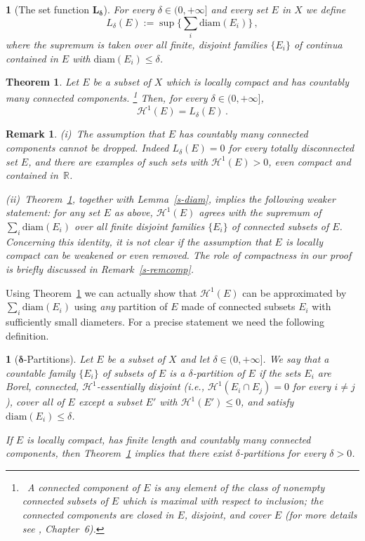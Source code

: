 \documentclass[11pt,reqno,a4paper,final]{amsart}
\numberwithin{equation}{section}
\theoremstyle{mytheorem}
\newtheorem{theorem}[subsection]{Theorem}
\theoremstyle{myremark}
\newtheorem{remark}[subsection]{Remark}
\theoremstyle{myparagraph}
\newtheorem{parag}[subsection]{}
\newcommand{\footnoteb}[1]{\footnote{~#1}}
\newcommand{\R}{\mathbb{R}}
\newcommand{\Haus}{\mathscr{H}}
\newcommand{\diam}{\mathrm{diam}}
\begin{document}
\begin{parag}[The set function $\boldsymbol{L_\delta}$]
\label{s-conmeas}
For every $\delta\in (0,+\infty]$ and every set $E$ in $X$ we define
\[
L_\delta(E) := \sup \bigg\{ \sum_i \diam(E_i) \bigg\} 
\, ,   
\]
where the supremum is taken over all finite, disjoint families 
$\{E_i\}$ of \emph{continua} contained in $E$ with $\diam(E_i)\le\delta$. 
\end{parag}


\begin{theorem}
\label{s-lunghezza}
Let $E$ be a subset of $X$ which is locally compact 
and has countably many connected components.%
%
\footnoteb{A connected component of $E$ 
is any element of the class of nonempty connected subsets
of $E$ which is maximal with respect to inclusion; 
the connected components are closed in $E$, disjoint, 
and cover $E$ (for more details see \cite{Eng}, Chapter~6).} 
Then, for every $\delta \in (0,+\infty]$,
%
\begin{equation}
\label{e-lunghezza}
\Haus^1(E) = L_\delta(E)
\, .
\end{equation}
\end{theorem}

\begin{remark}
(i)~The assumption that $E$ has countably many connected components cannot 
be dropped. Indeed $L_\delta(E)=0$ for every totally disconnected set $E$, 
and there are examples of such sets with $\Haus^1(E)>0$, 
even compact and contained in~$\R$.

\smallskip
(ii)~Theorem~\ref{s-lunghezza}, together with Lemma~\ref{s-diam},
implies the following weaker statement: 
for any set $E$ as above, $\Haus^1(E)$ agrees with the supremum of 
$\sum_i \diam(E_i)$ over all finite disjoint families $\{E_i\}$ of
connected subsets of $E$.  
Concerning this identity, it is not clear if the assumption that 
$E$ is locally compact can be weakened or even removed.
The role of compactness in our proof is briefly 
discussed in Remark~\ref{s-remcomp}.
\end{remark}


Using Theorem~\ref{s-lunghezza} we can actually show that $\Haus^1(E)$
can be approximated by $\sum_i \diam(E_i)$ using \emph{any} partition 
of $E$ made of connected subsets $E_i$ with sufficiently small diameters. 
For a precise statement we need the following definition.

\begin{parag}[$\boldsymbol{\delta}$-Partitions]
\label{s-deltapartitions}
Let $E$ be a subset of $X$ and let $\delta\in(0,+\infty]$.
We say that a countable family $\{E_i\}$ of subsets of $E$ 
is a \emph{$\delta$-partition} of $E$ if the sets $E_i$ 
are Borel, connected, $\Haus^1$-essentially disjoint 
(i.e., $\Haus^1(E_i\cap E_j)=0$ for every $i\ne j$), 
cover all of $E$ except a subset $E'$ with $\Haus^1(E')\le 0$, 
and satisfy $\diam(E_i)\le\delta$.

If $E$ is locally compact, has finite length 
and countably many connected components, 
then Theorem~\ref{s-lunghezza}
implies that there exist $\delta$-partitions for every $\delta>0$. 
\end{parag}
\end{document}
